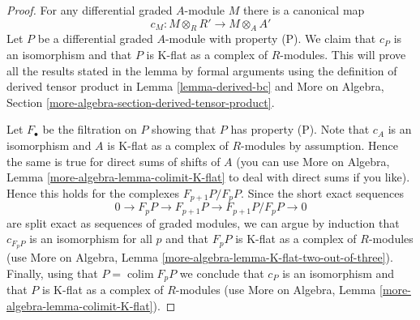 \documentclass[10pt,a4paper]{amsart}
\theoremstyle{plain}
\theoremstyle{definition}
\theoremstyle{remark}
\numberwithin{equation}{subsection}
\def\colim{\mathop{\mathrm{colim}}\nolimits}
\begin{document}
\begin{proof}
For any differential graded $A$-module $M$ there is a canonical map
$$
c_M : M \otimes_R R' \longrightarrow M \otimes_A A'
$$
Let $P$ be a differential graded $A$-module with property (P).
We claim that $c_P$ is an isomorphism and that $P$ is K-flat
as a complex of $R$-modules. This will prove all the results
stated in the lemma by formal arguments using the definition
of derived tensor product in Lemma \ref{lemma-derived-bc} and
More on Algebra, Section \ref{more-algebra-section-derived-tensor-product}.

\medskip\noindent
Let $F_\bullet$ be the filtration on $P$ showing that $P$ has property (P).
Note that $c_A$ is an isomorphism and $A$ is K-flat as a complex
of $R$-modules by assumption. Hence the same is true for
direct sums of shifts of $A$ (you can use
More on Algebra, Lemma \ref{more-algebra-lemma-colimit-K-flat}
to deal with direct sums if you like).
Hence this holds for the complexes $F_{p + 1}P/F_pP$.
Since the short exact sequences
$$
0 \to F_pP \to F_{p + 1}P \to F_{p + 1}P/F_pP \to 0
$$
are split exact as sequences of graded modules, we can argue
by induction that $c_{F_pP}$ is an isomorphism for all $p$
and that $F_pP$ is K-flat as a complex of $R$-modules (use
More on Algebra, Lemma \ref{more-algebra-lemma-K-flat-two-out-of-three}).
Finally, using that $P = \colim F_pP$ we conclude that
$c_P$ is an isomorphism and that $P$ is K-flat
as a complex of $R$-modules (use
More on Algebra, Lemma \ref{more-algebra-lemma-colimit-K-flat}).
\end{proof}
\end{document}
